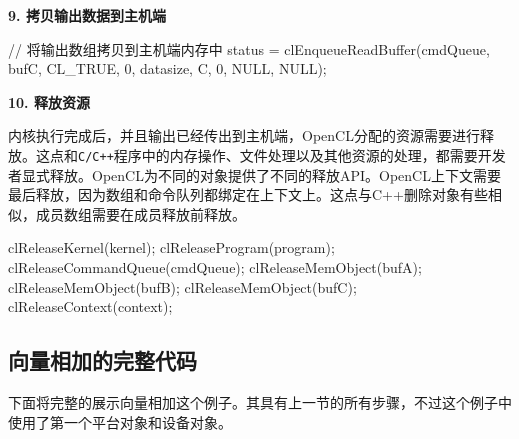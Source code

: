 \textbf{9. 拷贝输出数据到主机端}

\begin{codebox}[cpp]
// 将输出数组拷贝到主机端内存中
status = clEnqueueReadBuffer(cmdQueue, bufC, CL_TRUE, 0, datasize, C, 0, NULL, NULL);
\end{codebox}

\textbf{10. 释放资源}

内核执行完成后，并且输出已经传出到主机端，OpenCL分配的资源需要进行释放。这点和\texttt{C/C++}程序中的内存操作、文件处理以及其他资源的处理，都需要开发者显式释放。OpenCL为不同的对象提供了不同的释放API。OpenCL上下文需要最后释放，因为数组和命令队列都绑定在上下文上。这点与C++删除对象有些相似，成员数组需要在成员释放前释放。

\begin{codebox}[cpp]
clReleaseKernel(kernel);
clReleaseProgram(program);
clReleaseCommandQueue(cmdQueue);
clReleaseMemObject(bufA);
clReleaseMemObject(bufB);
clReleaseMemObject(bufC);
clReleaseContext(context);
\end{codebox}

\subsection{向量相加的完整代码}

下面将完整的展示向量相加这个例子。其具有上一节的所有步骤，不过这个例子中使用了第一个平台对象和设备对象。

